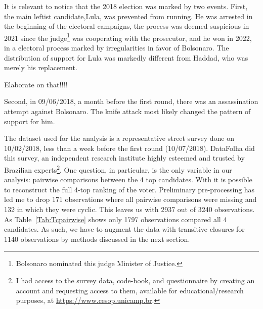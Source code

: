\documentclass[hidelinks,11pt]{article}
\begin{document}
It is relevant to notice that the 2018 election was marked by two events. First,
the main leftist candidate,Lula, was prevented from running. He was arrested in
the beginning of the electoral campaigns, the process was deemed suspicious in
2021 since the judge\footnote{Bolsonaro nominated this judge Minister of
  Justice.} was cooperating with the prosecutor, and he won in 2022, in a
electoral process marked by irregularities in favor of Bolsonaro. The
distribution of support for Lula was markedly different from Haddad, who was
merely his replacement.

\Big{\textcolor{red}{TODO}} Elaborate on that!!!!

Second, in 09/06/2018, a month before the first round, there was an
assassination attempt against Bolsonaro. The knife attack most likely changed
the pattern of support for him.


The dataset used for the analysis is a representative street survey done on
10/02/2018, less than a week before the first round (10/07/2018). DataFolha did
this survey, an independent research institute highly esteemed and trusted by
Brazilian experts\footnote{I had access to the survey data, code-book, and
  questionnaire by creating an account and requesting access to them, available
  for educational/research purposes, at \url{https://www.cesop.unicamp.br}.}.
One question, in particular, is the only variable in our analysis: pairwise
comparisons between the 4 top candidates. With it is possible to reconstruct the
full 4-top ranking of the voter. Preliminary pre-processing has led me to drop
171 observations where all pairwise comparisons were missing and 132 in which
they were cyclic. This leaves us with 2937 out of 3240 observations. As
Table~\ref{Tab:Tcpairwise} shows only 1797 observations compared all 4
candidates. As such, we have to augment the data with transitive closures for
1140 observations by methods discussed in the next section.

\begin{table}[]\centering
{}
\caption{Frequency of pairwise comparisons in the dataset.}

\label{Tab:Tcpairwise}
\end{table}
\end{document}
